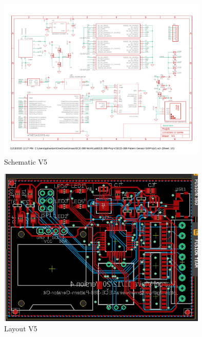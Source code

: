 \documentclass[12pt]{article}
\begin{document}
\begin{figure}[htp]
    \centering
    \includegraphics[width=10cm]{ProjV5.pdf}
    \caption{Schematic V5}
\end{figure}

\begin{figure}[htp]
    \centering
    \includegraphics[width=10cm]{LayoutV5.png}
    \caption{Layout V5}
\end{figure}
\end{document}
